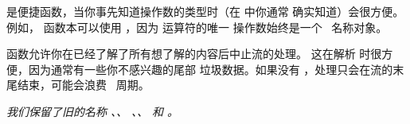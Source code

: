  是便捷函数，当你事先知道操作数的类型时（在 \PDF 中你通常
确实知道）会很方便。例如， 函数本可以使用
，因为  运算符的唯一
操作数始终是一个 \PDF\ 名称对象。

 函数允许你在已经了解了所有想了解的内容后中止流的处理。
这在解析  时很方便，因为通常有一些你不感兴趣的尾部
垃圾数据。如果没有 ，处理只会在流的末尾结束，可能会浪费
\CPU\ 周期。

{\em 我们保留了旧的名称 、、
、、 和 。}
